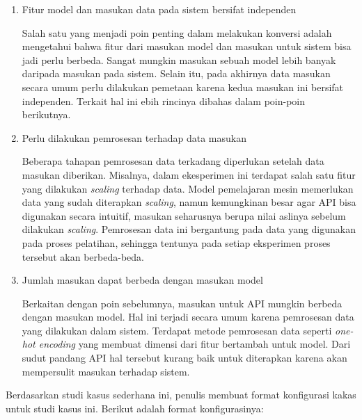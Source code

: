 \begin{enumerate}
	\item Fitur model dan masukan data pada sistem bersifat independen
	
	Salah satu yang menjadi poin penting dalam melakukan konversi adalah mengetahui bahwa fitur dari masukan model dan masukan untuk sistem bisa jadi perlu berbeda.
	Sangat mungkin masukan sebuah model lebih banyak daripada masukan pada sistem.
	Selain itu, pada akhirnya data masukan secara umum perlu dilakukan pemetaan karena kedua masukan ini bersifat independen.
	Terkait hal ini ebih rincinya dibahas dalam poin-poin berikutnya.

	\item Perlu dilakukan pemrosesan terhadap data masukan
	
	Beberapa tahapan pemrosesan data terkadang diperlukan setelah data masukan diberikan.
	Misalnya, dalam ekesperimen ini terdapat salah satu fitur yang dilakukan \textit{scaling} terhadap data.
	Model pemelajaran mesin memerlukan data yang sudah diterapkan \textit{scaling}, namun kemungkinan besar agar API bisa digunakan secara intuitif, masukan seharusnya berupa nilai aslinya sebelum dilakukan \textit{scaling}.
	Pemrosesan data ini bergantung pada data yang digunakan pada proses pelatihan, sehingga tentunya pada setiap eksperimen proses tersebut akan berbeda-beda.
	
	\item Jumlah masukan dapat berbeda dengan masukan model
	
	Berkaitan dengan poin sebelumnya, masukan untuk API mungkin berbeda dengan masukan model.
	Hal ini terjadi secara umum karena pemrosesan data yang dilakukan dalam sistem.
	Terdapat metode pemrosesan data seperti \textit{one-hot encoding} yang membuat dimensi dari fitur bertambah untuk model.
	Dari sudut pandang API hal tersebut kurang baik untuk diterapkan karena akan mempersulit masukan terhadap sistem.
\end{enumerate}

Berdasarkan studi kasus sederhana ini, penulis membuat format konfigurasi kakas untuk studi kasus ini.
Berikut adalah format konfigurasinya:

